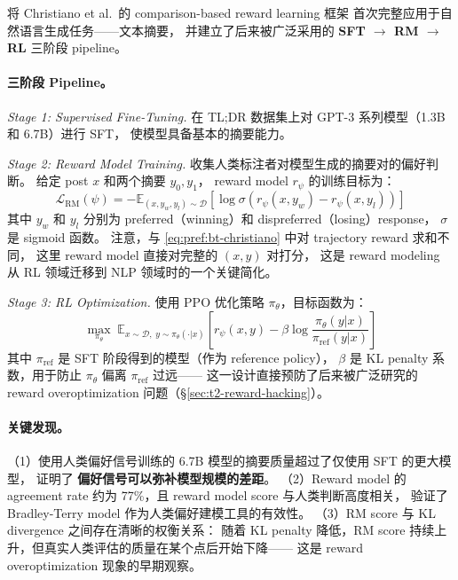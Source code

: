  将 Christiano et al.\ 的 comparison-based reward learning 框架
首次完整应用于自然语言生成任务——文本摘要，
并建立了后来被广泛采用的 \textbf{SFT $\rightarrow$ RM $\rightarrow$ RL} 三阶段 pipeline。

\paragraph{三阶段 Pipeline。}

\textit{Stage 1: Supervised Fine-Tuning.}
在 TL;DR 数据集上对 GPT-3 系列模型（1.3B 和 6.7B）进行 SFT，
使模型具备基本的摘要能力。

\textit{Stage 2: Reward Model Training.}
收集人类标注者对模型生成的摘要对的偏好判断。
给定 post $x$ 和两个摘要 $y_0, y_1$，
reward model $r_\psi$ 的训练目标为：
\begin{equation}
\label{eq:pref:rm-loss-summarize}
\mathcal{L}_{\text{RM}}(\psi) = -\mathbb{E}_{(x, y_w, y_l) \sim \mathcal{D}} \left[
  \log \sigma\!\left(r_\psi(x, y_w) - r_\psi(x, y_l)\right)
\right]
\end{equation}
其中 $y_w$ 和 $y_l$ 分别为 preferred（winning）和 dispreferred（losing）response，
$\sigma$ 是 sigmoid 函数。
注意，与 \cref{eq:pref:bt-christiano} 中对 trajectory reward 求和不同，
这里 reward model 直接对完整的 $(x, y)$ 对打分，
这是 reward modeling 从 RL 领域迁移到 NLP 领域时的一个关键简化。

\textit{Stage 3: RL Optimization.}
使用 PPO 优化策略 $\pi_\theta$，目标函数为：
\begin{equation}
\label{eq:pref:rl-obj-summarize}
\max_{\pi_\theta}\; \mathbb{E}_{x \sim \mathcal{D},\; y \sim \pi_\theta(\cdot|x)} \left[
  r_\psi(x, y) - \beta \log \frac{\pi_\theta(y|x)}{\pi_{\text{ref}}(y|x)}
\right]
\end{equation}
其中 $\pi_{\text{ref}}$ 是 SFT 阶段得到的模型（作为 reference policy），
$\beta$ 是 KL penalty 系数，用于防止 $\pi_\theta$ 偏离 $\pi_{\text{ref}}$ 过远——
这一设计直接预防了后来被广泛研究的 reward overoptimization 问题（\S\ref{sec:t2-reward-hacking}）。

\paragraph{关键发现。}
（1）使用人类偏好信号训练的 6.7B 模型的摘要质量超过了仅使用 SFT 的更大模型，
证明了 \textbf{偏好信号可以弥补模型规模的差距}。
（2）Reward model 的 agreement rate 约为 77\%，且 reward model score 与人类判断高度相关，
验证了 Bradley-Terry model 作为人类偏好建模工具的有效性。
（3）RM score 与 KL divergence 之间存在清晰的权衡关系：
随着 KL penalty 降低，RM score 持续上升，但真实人类评估的质量在某个点后开始下降——
这是 reward overoptimization 现象的早期观察。

